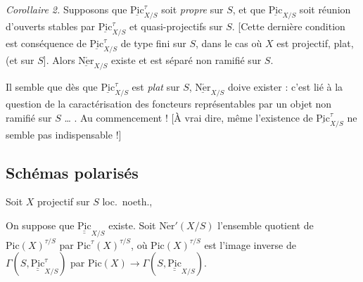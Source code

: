 \documentclass[11pt,a4paper]{article}
\begin{document}
\emph{Corollaire 2.} Supposons que $\underline{\mathrm{Pic}}^{\tau}_{X/S}$ soit \emph{propre}  sur $S$, et que $\underline{\mathrm{Pic}}_{X/S}$ soit réunion  d'ouverts  stables par $\underline{\mathrm{Pic}}^{\tau}_{X/S}$ et quasi-projectifs sur $S$. [Cette dernière condition est conséquence de $\underline{\mathrm{Pic}}^{\tau}_{X/S}$ de type fini sur $S$, dans le cas où $X$ est projectif, plat,  (et  sur $S$]. Alors $\underline{\mathrm{N\acute{e}r}}_{X/S}$ existe et est séparé non ramifié sur $S$.

Il semble que dès que $\underline{\mathrm{Pic}}^{\tau}_{X/S}$ est \emph{plat} \struck{\ill{}}  sur $S$, $\underline{\mathrm{N\acute{e}r}}_{X/S}$ doive exister : c'est lié à la question de la caractérisation des foncteurs représentables par un objet non ramifié sur $S$ … . Au commencement ! [À vrai dire, même l'existence de $\underline{\mathrm{Pic}}^{\tau}_{X/S}$ ne semble pas indispensable !]

\subsection{Schémas polarisés}

Soit $X$ projectif sur $S$ loc.\ noeth.,  \struck{\ill{}} 


On suppose que $\underline{\underline{\mathrm{Pic}}}_{X/S}$ existe. Soit $\mathrm{N\acute{e}r}'(X/S)$ l'ensemble quotient de $\mathrm{Pic}(X)^{\tau/S}$ \struck{\ill{}} par $\mathrm{Pic}^{\tau}(X)^{\tau/S}$, où $\mathrm{Pic}(X)^{\tau/S}$ est l'image inverse de $\Gamma(S, \underline{\underline{\mathrm{Pic}}}^{\tau}_{X/S})$ par $\mathrm{Pic}(X) \to \Gamma(S, \underline{\underline{\mathrm{Pic}}}_{X/S})$.
\end{document}
